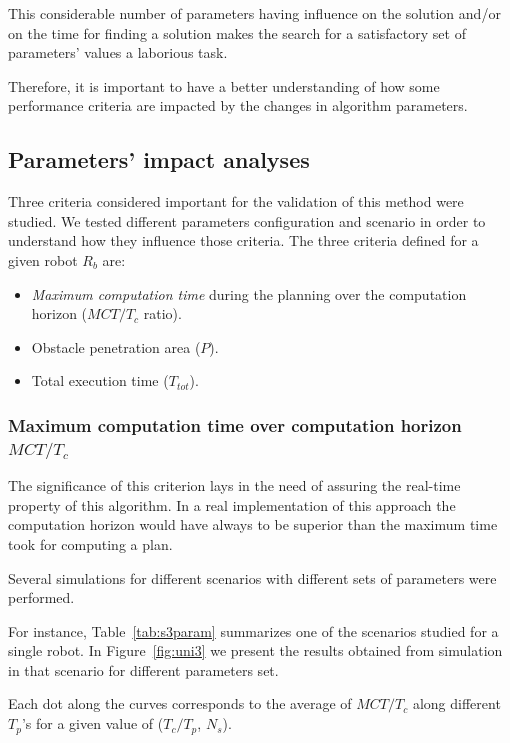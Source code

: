 \documentclass[eprint]{actapoly}
\begin{document}
This considerable number of parameters having influence on the solution
and/or on the time for finding a solution makes the search for a
satisfactory set of parameters' values a laborious task.

Therefore, it is important to have a better understanding of how some
performance criteria are impacted by the changes in algorithm
parameters.

\subsection{Parameters' impact analyses}

Three criteria considered important for the validation of this method were studied.
We tested different parameters configuration and scenario in order to 
understand how they influence
those criteria.
The three criteria defined for a given robot $R_b$ are:

\begin{itemize}

\item
\textit{Maximum computation time} during the planning over the computation horizon ($MCT/T_c$ 
ratio).

\item
Obstacle penetration area ($P$).

\item
Total execution time ($T_{tot}$).

\end{itemize}

\subsubsection{Maximum computation time over computation horizon $MCT/T_c$}

The significance of this criterion lays in the need of assuring the 
real-time property of this algorithm.
In a real implementation of this approach the computation horizon would have 
always to be superior than the
maximum time took for computing a plan.

Several simulations for different scenarios with different sets of parameters were
performed.

For instance, Table~\ref{tab:s3param} summarizes one of the scenarios studied for a 
single robot. In Figure~\ref{fig:uni3} we present the results obtained from simulation in 
that scenario for different parameters set.

Each dot along the curves corresponds to the average of $MCT/T_c$ along different $T_p$'s for a given value of ($T_c/T_p$, $N_s$).
\end{document}
